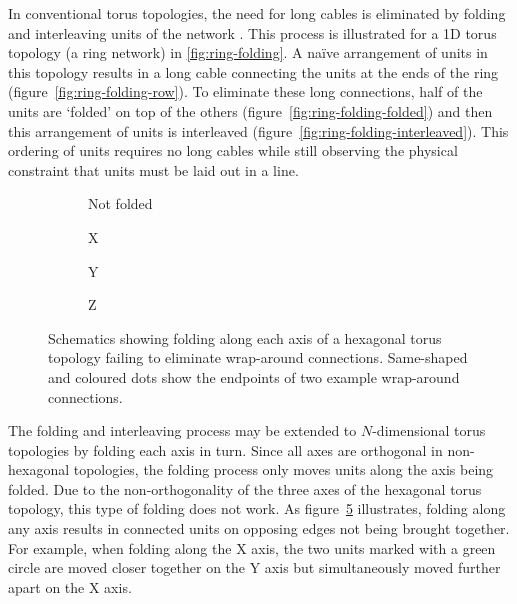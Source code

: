 		In conventional torus topologies, the need for long cables is eliminated by
		folding and interleaving units of the network \cite{dally04}. This process
		is illustrated for a 1D torus topology (a ring network) in
		\ref{fig:ring-folding}. A na\"ive arrangement of units in this topology
		results in a long cable connecting the units at the ends of the ring
		(figure~\ref{fig:ring-folding-row}).  To eliminate these long connections,
		half of the units are `folded' on top of the others
		(figure~\ref{fig:ring-folding-folded}) and then this arrangement of units
		is interleaved (figure~\ref{fig:ring-folding-interleaved}). This ordering
		of units requires no long cables while still observing the physical
		constraint that units must be laid out in a line.
		
		\begin{figure}
			\center
			\begin{subfigure}[b]{0.24\linewidth}
				\center
				\caption{Not folded}
				\label{fig:failing-to-fold-hex-toruses-none}
			\end{subfigure}
			\begin{subfigure}[b]{0.24\linewidth}
				\center
				\caption{X}
				\label{fig:failing-to-fold-hex-toruses-x}
			\end{subfigure}
			\begin{subfigure}[b]{0.24\linewidth}
				\center
				\caption{Y}
				\label{fig:failing-to-fold-hex-toruses-y}
			\end{subfigure}
			\begin{subfigure}[b]{0.24\linewidth}
				\center
				\caption{Z}
				\label{fig:failing-to-fold-hex-toruses-z}
			\end{subfigure}
			
			\caption[Folding each axis of a hexagonal torus topology]%
			{Schematics showing folding along each axis of a hexagonal
			torus topology failing to eliminate wrap-around connections.  Same-shaped
			and coloured dots show the endpoints of two example wrap-around
			connections.}
			\label{fig:failing-to-fold-hex-toruses}
		\end{figure}
		
		The folding and interleaving process may be extended to $N$-dimensional
		torus topologies by folding each axis in turn. Since all axes are
		orthogonal in non-hexagonal topologies, the folding process only moves
		units along the axis being folded. Due to the non-orthogonality of the
		three axes of the hexagonal torus topology, this type of folding does not
		work. As figure~\ref{fig:failing-to-fold-hex-toruses} illustrates, folding
		along any axis results in connected units on opposing edges not being
		brought together. For example, when folding along the X axis, the two units
		marked with a green circle are moved closer together on the Y axis but
		simultaneously moved further apart on the X axis.
	
